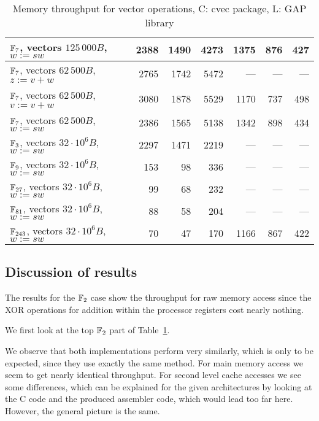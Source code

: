 \begin{table}[ht]
\begin{center}
\begin{tabular}{|l|r|r|r|r|r|r|}
$\mathbb{F}_7$, vectors $125\,000 B$, $w := sw$      
& 2388 & 1490 & 4273 & 1375 & 876 & 427  \\
\hline                                                    
$\mathbb{F}_7$, vectors $62\,500 B$, $z := v+w$      
& 2765 & 1742 & 5472 & ---  & --- & --- \\
\hline
$\mathbb{F}_7$, vectors $62\,500 B$, $v := v+w$      
& 3080 & 1878 & 5529 & 1170 & 737 & 498 \\
\hline                                                    
$\mathbb{F}_7$, vectors $62\,500 B$, $w := sw$       
& 2386 & 1565 & 5138 & 1342 & 898 & 434 \\
\hline
\hline
$\mathbb{F}_3$, vectors $32\cdot 10^6 B$, $w := sw$
& 2297 & 1471 & 2219 & --- & --- & --- \\
\hline
$\mathbb{F}_9$, vectors $32\cdot 10^6 B$, $w := sw$
& 153 & 98 & 336 & --- & --- & --- \\
\hline
$\mathbb{F}_{27}$, vectors $32\cdot 10^6 B$, $w := sw$
& 99 & 68 & 232 & --- & --- & --- \\
\hline
$\mathbb{F}_{81}$, vectors $32\cdot 10^6 B$, $w := sw$
& 88 & 58 & 204 & --- & --- & --- \\
\hline
$\mathbb{F}_{243}$, vectors $32\cdot 10^6 B$, $w := sw$
& 70 & 47 & 170 & 1166 & 867 & 422 \\
\hline
\end{tabular}
\end{center}
\caption{Memory throughput for vector operations, C: {\sf cvec} package, 
L: {\sf GAP} library}
\label{memthrough}
\end{table}

\subsection{Discussion of results}
\label{ssec:discussion}

The results for the $\mathbb{F}_2$ case show the throughput for raw memory access
since the XOR operations for addition within the processor registers cost
nearly nothing. 

We first look at the top $\mathbb{F}_2$ part of Table~\ref{memthrough}.

We observe that both implementations perform very similarly, which is
only to be expected, since they use exactly the same method. For
main memory access we seem to get nearly identical throughput. For 
second level cache accesses we see some differences, which can be
explained for the given architectures by looking at the C code and the
produced assembler code, which would lead too far here. However, 
the general picture is the same.

